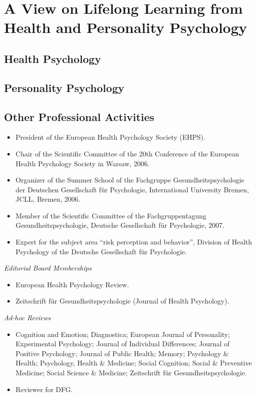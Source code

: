 \section{A View on Lifelong Learning from Health and Personality
Psychology} 
\subsection{Health Psychology}



\subsection{Personality Psychology}



\subsection{Other Professional Activities}

\begin{itemize}
\item President of the European Health Psychology Society (EHPS).
\item Chair of the Scientific Committee of the 20th Conference of the European Health Psychology Society in Warsaw, 2006.
\item Organizer of the Summer School of the Fachgruppe Gesundheitspsychologie der Deutschen Gesellschaft f\"{u}r Psychologie, International University Bremen, JCLL, Bremen, 2006.
\item Member of the Scientific Committee of the Fachgruppentagung Gesundheitspsychologie, Deutsche Gesellschaft f\"{u}r Psychologie, 2007.
\item Expert for the subject area ``risk perception and behavior'', Division of Health Psychology of the Deutsche Gesellschaft f\"{u}r Psychologie.
\end{itemize}

\textit{Editorial Board Memberships}

\begin{itemize}
\item European Health Psychology Review.
\item	Zeitschrift f\"{u}r Gesundheitspsychologie (Journal of Health Psychology).
\end{itemize}

\textit{Ad-hoc Reviews}

\begin{itemize}
\item Cognition and Emotion; Diagnostica; European Journal of Personality; Experimental Psychology; Journal of Individual Differences; Journal of Positive Psychology; Journal of Public Health; Memory; Psychology \& Health; Psychology, Health \& Medicine; Social Cognition; Social \& Preventive Medicine; Social Science \& Medicine; Zeitschrift f\"{u}r Gesundheitspsychologie.
\item Reviewer for DFG.
\end{itemize}
 
 
